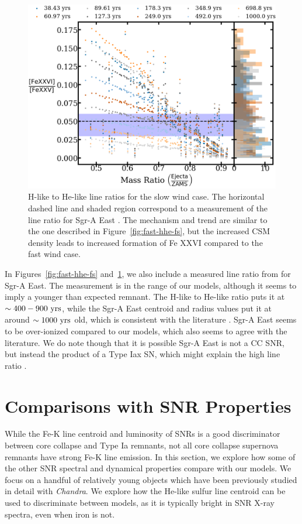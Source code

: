 \documentclass[twocolumn]{aastex631}
\begin{document}
\begin{figure}[htb]
    \centering
    \includegraphics[scale=0.17]{slowhherat.png}
    \caption{H-like to He-like line ratios for the slow wind case. The horizontal dashed line and shaded region correspond to a measurement of the line ratio for Sgr-A East \citep{koyama}. The mechanism and trend are similar to the one described in Figure~\ref{fig:fast-hhe-fs}, but the increased CSM density leads to increased formation of Fe XXVI compared to the fast wind case.}
    \label{fig:slow-hhe-fs}
\end{figure}
 
 In Figures~\ref{fig:fast-hhe-fs} and~\ref{fig:slow-hhe-fs}, we also include a measured line ratio from \citet{koyama} for Sgr-A East. The measurement is in the range of our models, although it seems to imply a younger than expected remnant. The H-like to He-like ratio puts it at $\sim 400-900~\rm yrs$, while the Sgr-A East centroid and radius values put it at around $\sim 1000 \rm~yrs$ old, which is consistent with the literature \citep{koyama}. Sgr-A East seems to be over-ionized compared to our models, which also seems to agree with the literature. We do note though that it is possible Sgr-A East is not a CC SNR, but instead the product of a Type Iax SN, which might explain the high line ratio \citep{zhou20}. 

\section{Comparisons with SNR Properties}
\label{sec:snr_obs}
While the Fe-K line centroid and luminosity of SNRs is a good discriminator between
core collapse and Type Ia remnants, not all core collapse supernova remnants have
strong Fe-K line emission. In this section, we explore how some of the other 
SNR spectral and dynamical properties compare with our models. We focus on a handful
of relatively young objects which have been previously studied in detail with 
{\it Chandra}. We explore how the He-like sulfur line centroid can be used to 
discriminate between models, as it is typically bright in SNR X-ray spectra, even
when iron is not.
\end{document}
